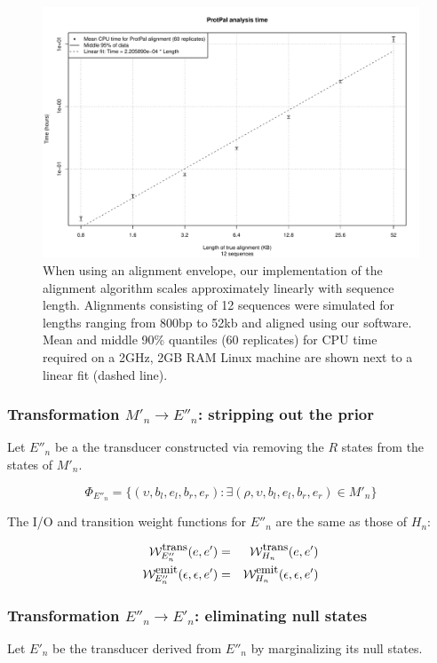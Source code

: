 \documentclass{article}
\newcommand{\seclabel}[1]{\label{sec.#1}}
\newcommand{\figlabel}[1]{\label{Figures.#1}}
\newcommand\States{\Phi}
\newcommand\statesof[1]{\States_{#1}}
\newcommand\weight{{\cal W}}
\newcommand\weightfunof[1]{\weight_{#1}}
\newcommand\transweightfun[1]{\weightfunof{#1}^{\mbox{\small trans}}}
\newcommand\emitweightfun[1]{\weightfunof{#1}^{\mbox{\small emit}}}
\newcommand\hstate{(\upsilon,b_l,e_l,b_r,e_r)}
\newcommand\mstate{(\rho,\upsilon,b_l,e_l,b_r,e_r)}
\begin{document}
\begin{center}
\begin{figure}[h!]
\includegraphics[width=1\textwidth]{time.pdf}
\caption{When using an alignment envelope, our implementation of the alignment algorithm
scales approximately linearly with sequence length.  Alignments consisting of 12 sequences
were simulated for lengths ranging from 800bp to 52kb and aligned using our software.
Mean and middle 90\% quantiles (60 replicates) for  CPU time required on a 2GHz, 2GB RAM Linux machine are
shown next to a linear fit (dashed line).  }
\figlabel{time}
\end{figure}
\end{center}


\subsubsection{Transformation $M'_n \to E''_n$: stripping out the prior}

Let $E''_n$ be a the transducer constructed via removing the $R$ states from the states of $M'_n$.  

\[
\statesof{E''_n} = \{ \hstate : \exists \mstate \in M'_n \}
\]

The I/O and transition weight functions for $E''_n$ are the same as those of $H_n$:

\begin{eqnarray*}
\transweightfun{E''_n}(e,e') & = & \transweightfun{H_n}(e,e') \\
\emitweightfun{E''_n}(\epsilon,\epsilon,e') & = & \emitweightfun{H_n}(\epsilon,\epsilon,e')
\end{eqnarray*}


\subsubsection{Transformation $E''_n \to E'_n$: eliminating null states}
\seclabel{NullStateElim}
Let $E'_n$ be the transducer derived from $E''_n$ by marginalizing its null states.  
\end{document}
